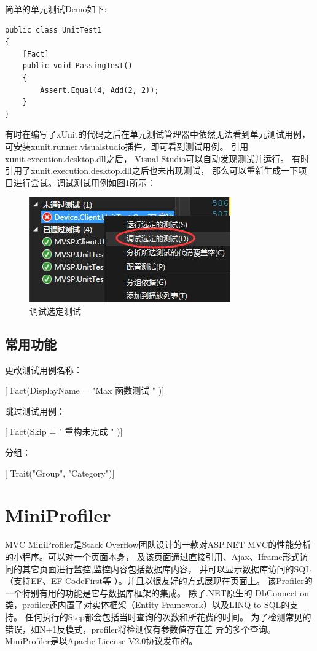\documentclass{book}
\begin{document}
简单的单元测试Demo如下:

\begin{lstlisting}[language={[Sharp]C}]
public class UnitTest1
{
	[Fact]
	public void PassingTest()
	{
		Assert.Equal(4, Add(2, 2));
	}
}
\end{lstlisting}

有时在编写了xUnit的代码之后在单元测试管理器中依然无法看到单元测试用例，
可安装xunit.runner.visualstudio插件，即可看到测试用例。
引用xunit.execution.desktop.dll之后，
Visual Studio可以自动发现测试并运行。
有时引用了xunit.execution.desktop.dll之后也未出现测试，
那么可以重新生成一下项目进行尝试。调试测试用例如图\ref{fig:DebugTestCase}所示：

\begin{figure}[htbp]
	\centering
	\includegraphics[scale=0.6]{DebugTestCase.jpg}
	\caption{调试选定测试}
	\label{fig:DebugTestCase}
\end{figure}

\subsection{常用功能}

更改测试用例名称：

[ Fact(DisplayName = "Max 函数测试 " )]

跳过测试用例：

[ Fact(Skip = " 重构未完成 " )]

分组：

[ Trait("Group", "Category")]




\section{MiniProfiler}

MVC MiniProfiler是Stack Overflow团队设计的一款对ASP.NET MVC的性能分析的小程序。可以对一个页面本身，
及该页面通过直接引用、Ajax、Iframe形式访问的其它页面进行监控,监控内容包括数据库内容，
并可以显示数据库访问的SQL（支持EF、EF CodeFirst等 ）。并且以很友好的方式展现在页面上。
该Profiler的一个特别有用的功能是它与数据库框架的集成。
除了.NET原生的 DbConnection类，profiler还内置了对实体框架（Entity Framework）以及LINQ to SQL的支持。
任何执行的Step都会包括当时查询的次数和所花费的时间。
为了检测常见的错误，如N+1反模式，profiler将检测仅有参数值存在差 异的多个查询。
MiniProfiler是以Apache License V2.0协议发布的。
\end{document}
